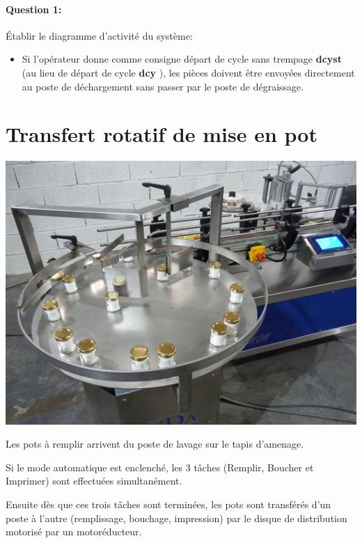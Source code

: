 \paragraph{Question 1:} Établir le diagramme d'activité du système:
\begin{itemize}
 \item Si l'opérateur donne comme consigne \og départ de cycle sans trempage \textbf{dcyst} \fg (au lieu de \og départ de cycle \textbf{dcy} \og), les pièces doivent être envoyées directement au poste de déchargement sans passer par le poste de dégraissage. 
\end{itemize}

\newpage

\section{Transfert rotatif de mise en pot}


\begin{minipage}{0.35\linewidth}
 \centering\includegraphics[width=0.9\linewidth]{img/Transfert1.jpg}
\end{minipage}
\hfill
\begin{minipage}{0.63\linewidth}
Les pots à remplir arrivent du poste de lavage sur le tapis d'amenage. 

Si le mode automatique est enclenché, les 3 tâches (Remplir, Boucher et Imprimer) sont effectuées simultanément. 

Ensuite dès que ces trois tâches sont terminées, les pots sont transférés d'un poste à l'autre (remplissage, bouchage, impression) par le disque de distribution motorisé par un motoréducteur.
\end{minipage}

